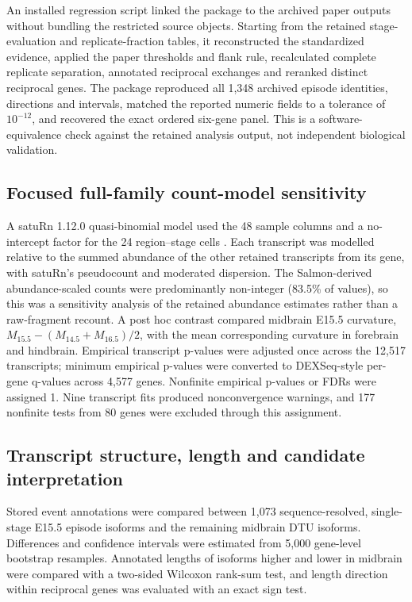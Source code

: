 \documentclass[11pt,a4paper]{article}
\begin{document}
An installed regression script linked the package to the archived paper outputs without bundling the restricted source objects. Starting from the retained stage-evaluation and replicate-fraction tables, it reconstructed the standardized evidence, applied the paper thresholds and flank rule, recalculated complete replicate separation, annotated reciprocal exchanges and reranked distinct reciprocal genes. The package reproduced all 1,348 archived episode identities, directions and intervals, matched the reported numeric fields to a tolerance of $10^{-12}$, and recovered the exact ordered six-gene panel. This is a software-equivalence check against the retained analysis output, not independent biological validation.

\subsection{Focused full-family count-model sensitivity}

A satuRn 1.12.0 quasi-binomial model used the 48 sample columns and a no-intercept factor for the 24 region--stage cells \citep{gilis_saturn_2022}. Each transcript was modelled relative to the summed abundance of the other retained transcripts from its gene, with satuRn's pseudocount and moderated dispersion. The Salmon-derived abundance-scaled counts were predominantly non-integer (83.5\% of values), so this was a sensitivity analysis of the retained abundance estimates rather than a raw-fragment recount. A post hoc contrast compared midbrain E15.5 curvature, $M_{15.5}-(M_{14.5}+M_{16.5})/2$, with the mean corresponding curvature in forebrain and hindbrain. Empirical transcript p-values were adjusted once across the 12,517 transcripts; minimum empirical p-values were converted to DEXSeq-style per-gene q-values across 4,577 genes. Nonfinite empirical p-values or FDRs were assigned 1. Nine transcript fits produced nonconvergence warnings, and 177 nonfinite tests from 80 genes were excluded through this assignment.

\subsection{Transcript structure, length and candidate interpretation}

Stored event annotations were compared between 1,073 sequence-resolved, single-stage E15.5 episode isoforms and the remaining midbrain DTU isoforms. Differences and confidence intervals were estimated from 5,000 gene-level bootstrap resamples. Annotated lengths of isoforms higher and lower in midbrain were compared with a two-sided Wilcoxon rank-sum test, and length direction within reciprocal genes was evaluated with an exact sign test.
\end{document}
